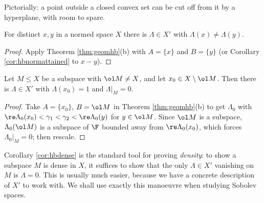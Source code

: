 Pictorially: a point outside a closed convex set can be cut off from it by a hyperplane, with room to spare.

\begin{center}
\end{center}

\begin{corollary}\label{cor:hbsep}
	For distinct $x,y$ in a normed space $X$ there is $\Lambda \in X'$ with $\Lambda(x) \ne \Lambda(y)$.
\end{corollary}

\begin{proof}
	Apply Theorem \ref{thm:geomhb}(b) with $A = \{x\}$ and $B = \{y\}$ (or Corollary \ref{cor:hbnormattained} to $x - y$).
\end{proof}

\begin{corollary}\label{cor:hbdense}
	Let $M \le X$ be a subspace with $\ol M \ne X$, and let $x_0 \in X \setminus \ol M$. Then there is $\Lambda \in X'$ with $\Lambda(x_0) = 1$ and $\Lambda|_M = 0$.
\end{corollary}

\begin{proof}
	Take $A = \{x_0\}$, $B = \ol M$ in Theorem \ref{thm:geomhb}(b) to get $\Lambda_0$ with $\re \Lambda_0(x_0) < \gamma_1 < \gamma_2 < \re\Lambda_0(y)$ for $y \in \ol M$. Since $\ol M$ is a subspace, $\Lambda_0(\ol M)$ is a subspace of $\F$ bounded away from $\re\Lambda_0(x_0)$, which forces $\Lambda_0|_M = 0$; then rescale.
\end{proof}

\begin{remark}
	Corollary \ref{cor:hbdense} is the standard tool for proving \emph{density}: to show a subspace $M$ is dense in $X$, it suffices to show that the only $\Lambda \in X'$ vanishing on $M$ is $\Lambda = 0$. This is usually much easier, because we have a concrete description of $X'$ to work with. We shall use exactly this manoeuvre when studying Sobolev spaces.
\end{remark}


